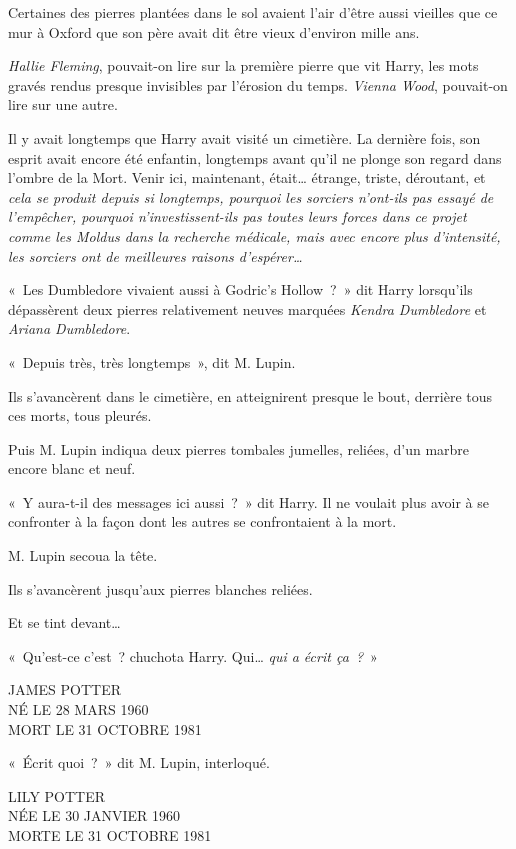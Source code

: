 Certaines des pierres plantées dans le sol avaient l'air d'être aussi vieilles que ce mur à Oxford que son père avait dit être vieux d'environ mille ans.

\emph{Hallie Fleming}, pouvait-on lire sur la première pierre que vit Harry, les mots gravés rendus presque invisibles par l'érosion du temps. \emph{Vienna Wood}, pouvait-on lire sur une autre.

Il y avait longtemps que Harry avait visité un cimetière. La dernière fois, son esprit avait encore été enfantin, longtemps avant qu'il ne plonge son regard dans l'ombre de la Mort. Venir ici, maintenant, était… étrange, triste, déroutant, et \emph{cela se produit depuis si longtemps, pourquoi les sorciers n'ont-ils pas essayé de l'empêcher, pourquoi n'investissent-ils pas toutes leurs forces dans ce projet comme les Moldus dans la recherche médicale, mais avec encore plus d'intensité, les sorciers ont de meilleures raisons d'espérer…}

«~Les Dumbledore vivaient aussi à Godric's Hollow~?~» dit Harry lorsqu'ils dépassèrent deux pierres relativement neuves marquées \emph{Kendra Dumbledore} et \emph{Ariana Dumbledore}.

«~Depuis très, très longtemps~», dit M. Lupin.

Ils s'avancèrent dans le cimetière, en atteignirent presque le bout, derrière tous ces morts, tous pleurés.

Puis M. Lupin indiqua deux pierres tombales jumelles, reliées, d'un marbre encore blanc et neuf.

«~Y aura-t-il des messages ici aussi~?~» dit Harry. Il ne voulait plus avoir à se confronter à la façon dont les autres se confrontaient à la mort.

M. Lupin secoua la tête.

Ils s'avancèrent jusqu'aux pierres blanches reliées.

Et se tint devant…

«~Qu'est-ce c'est~? chuchota Harry. Qui… \emph{qui a écrit ça~?}~»
\begin{center}
JAMES POTTER\\
NÉ LE 28 MARS 1960\\
MORT LE 31 OCTOBRE 1981
\end{center}

«~Écrit quoi~?~» dit M. Lupin, interloqué.

\begin{center}
LILY POTTER\\
NÉE LE 30 JANVIER 1960\\
MORTE LE 31 OCTOBRE 1981
\end{center}

